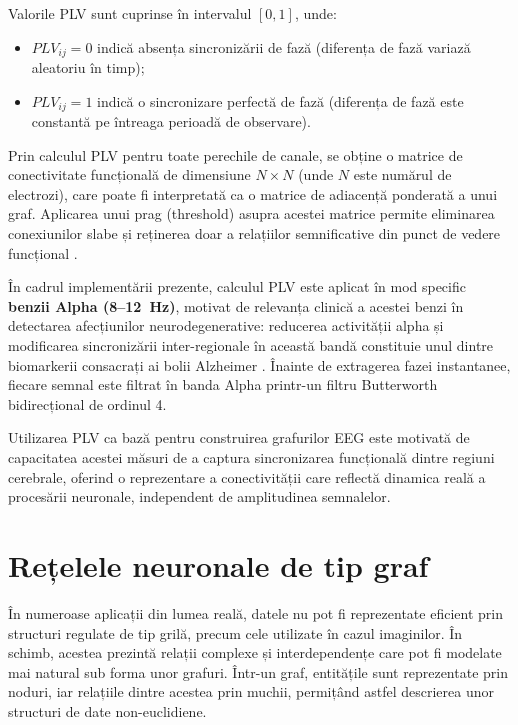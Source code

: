 \documentclass[12pt,a4paper]{report}
\theoremstyle{definition}
\theoremstyle{remark}
\begin{document}
Valorile PLV sunt cuprinse în intervalul $[0, 1]$, unde:
\begin{itemize}
    \item $PLV_{ij} = 0$ indică absența sincronizării de fază (diferența de fază variază aleatoriu în timp);
    \item $PLV_{ij} = 1$ indică o sincronizare perfectă de fază (diferența de fază este constantă pe întreaga perioadă de observare).
\end{itemize}

Prin calculul PLV pentru toate perechile de canale, se obține o matrice de conectivitate funcțională de dimensiune $N \times N$ (unde $N$ este numărul de electrozi), care poate fi interpretată ca o matrice de adiacență ponderată a unui graf. Aplicarea unui prag (threshold) asupra acestei matrice permite eliminarea conexiunilor slabe și reținerea doar a relațiilor semnificative din punct de vedere funcțional \cite{klepl2023gnn,rahman2025advancement}.

În cadrul implementării prezente, calculul PLV este aplicat în mod specific \textbf{benzii Alpha (8--12~Hz)}, motivat de relevanța clinică a acestei benzi în detectarea afecțiunilor neurodegenerative: reducerea activității alpha și modificarea sincronizării inter-regionale în această bandă constituie unul dintre biomarkerii consacrați ai bolii Alzheimer \cite{klepl2023gnn}. Înainte de extragerea fazei instantanee, fiecare semnal este filtrat în banda Alpha printr-un filtru Butterworth bidirecțional de ordinul 4.

Utilizarea PLV ca bază pentru construirea grafurilor EEG este motivată de capacitatea acestei măsuri de a captura sincronizarea funcțională dintre regiuni cerebrale, oferind o reprezentare a conectivității care reflectă dinamica reală a procesării neuronale, independent de amplitudinea semnalelor.

\section{Rețelele neuronale de tip graf}

În numeroase aplicații din lumea reală, datele nu pot fi reprezentate eficient prin structuri regulate de tip grilă, precum cele utilizate în cazul imaginilor. În schimb, acestea prezintă relații complexe și interdependențe care pot fi modelate mai natural sub forma unor grafuri. Într-un graf, entitățile sunt reprezentate prin noduri, iar relațiile dintre acestea prin muchii, permițând astfel descrierea unor structuri de date non-euclidiene.
\end{document}
